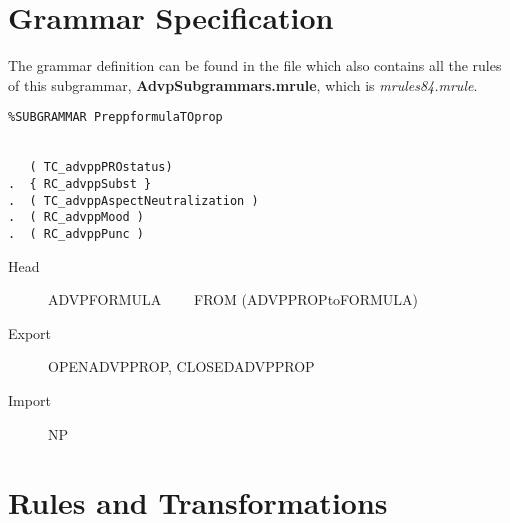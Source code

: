 \section{Grammar Specification}
The grammar definition can be found in the file which also contains all the 
rules of this subgrammar, {\bf AdvpSubgrammars.mrule}, 
which is {\em mrules84.mrule\/}.

\begin{verbatim}
%SUBGRAMMAR PreppformulaTOprop


   ( TC_advppPROstatus)
.  { RC_advppSubst }
.  ( TC_advppAspectNeutralization )
.  ( RC_advppMood )
.  ( RC_advppPunc )

\end{verbatim}

\begin{description}
  \item[Head]  ADVPFORMULA  \ \ \ \ FROM (ADVPPROPtoFORMULA)
  \item[Export] OPENADVPPROP, CLOSEDADVPPROP
  \item[Import] NP
\end{description}

\newpage
\section{Rules and Transformations}


